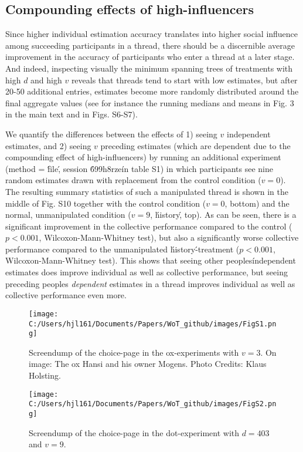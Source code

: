 \documentclass[9pt,twoside,lineno]{pnas-new}
\begin{document}
\subsection*{Compounding effects of high-influencers}
Since higher individual estimation accuracy translates into higher social influence among succeeding participants in a thread, there should be a discernible average improvement in the accuracy of participants who enter a thread at a later stage. And indeed, inspecting visually the minimum spanning trees of treatments with high $d$ and high $v$ reveals that threads tend to start with low estimates, but after 20-50 additional entries, estimates become more randomly distributed around the final aggregate values (see for instance the running medians and means in Fig. 3 in the main text and in Figs. S6-S7). 

We quantify the differences between the effects of 1) seeing $v$ independent estimates, and 2) seeing $v$ preceding estimates (which are dependent due to the compounding effect of high-influencers) by running an additional experiment (method = \'file\', session \'699h8rze\' in table S1) in which participants see nine random estimates drawn with replacement from the control condition ($v=0$). The resulting summary statistics of such a manipulated thread is shown in the middle of Fig. S10 together with the control condition ($v=0$, bottom) and the normal, unmanipulated condition ($v=9$, \'history\', top). As can be seen, there is a significant improvement in the collective performance compared to the control ($p<0.001$, Wilcoxon-Mann-Whitney test), but also a significantly worse collective performance compared to the unmanipulated \'history\'-treatment ($p<0.001$, Wilcoxon-Mann-Whitney test). This shows that seeing other peoples\' independent estimates does improve individual as well as collective performance, but seeing preceding peoples \textit{dependent} estimates in a thread improves individual as well as collective performance even more.

\begin{figure}
\centering
\texttt{[image: C:/Users/hjl161/Documents/Papers/WoT\_github/images/FigS1.png]}
\caption{Screendump of the choice-page in the ox-experiments with $v=3$. On image: The ox Hansi and his owner Mogens. Photo Credits: Klaus Holsting.}
\end{figure}

\begin{figure}
\centering
\texttt{[image: C:/Users/hjl161/Documents/Papers/WoT\_github/images/FigS2.png]}
\caption{Screendump of the choice-page in the dot-experiment with $d=403$ and $v=9$.}
\end{figure}
\end{document}
